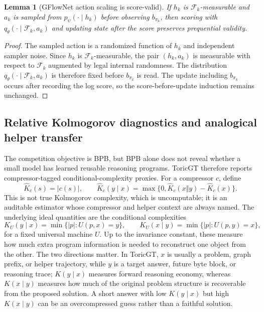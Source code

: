 \documentclass[11pt]{article}
\theoremstyle{definition}
\theoremstyle{plain}
\newtheorem{lemma}[definition]{Lemma}
\theoremstyle{remark}
\numberwithin{equation}{section}
\begin{document}
\begin{lemma}[GFlowNet action scaling is score-valid]
If $h_k$ is $\mathcal F_k$-measurable and $a_k$ is sampled from $p_\psi(\cdot\mid h_k)$ before observing $b_{\pi_k}$, then scoring with $q_\theta(\cdot\mid\mathcal F_k,a_k)$ and updating state after the score preserves prequential validity.
\end{lemma}

\begin{proof}
The sampled action is a randomized function of $h_k$ and independent sampler noise.  Since $h_k$ is $\mathcal F_k$-measurable, the pair $(h_k,a_k)$ is measurable with respect to $\mathcal F_k$ augmented by legal internal randomness.  The distribution $q_\theta(\cdot\mid\mathcal F_k,a_k)$ is therefore fixed before $b_{\pi_k}$ is read.  The update including $b_{\pi_k}$ occurs after recording the log score, so the score-before-update induction remains unchanged.
\end{proof}

\subsection{Relative Kolmogorov diagnostics and analogical helper transfer}

The competition objective is BPB, but BPB alone does not reveal whether a small model has learned reusable reasoning programs.  ToricGT therefore reports compressor-tagged conditional-complexity proxies.  For a compressor $c$, define
\begin{equation}
  \widehat K_c(s)=|c(s)|,\qquad
  \widehat K_c(y\mid x)=\max\{0,\widehat K_c(x\Vert y)-\widehat K_c(x)\}.
\end{equation}
This is not true Kolmogorov complexity, which is uncomputable; it is an auditable estimator whose compressor and helper context are always named.  The underlying ideal quantities are the conditional complexities
\begin{equation}
  K_U(y\mid x)=\min\{|p|:U(p,x)=y\},\qquad
  K_U(x\mid y)=\min\{|p|:U(p,y)=x\},
\end{equation}
for a fixed universal machine $U$.  Up to the invariance constant, these measure how much extra program information is needed to reconstruct one object from the other.  The two directions matter.  In ToricGT, $x$ is usually a problem, graph prefix, or helper trajectory, while $y$ is a target answer, future byte block, or reasoning trace; $K(y\mid x)$ measures forward reasoning economy, whereas $K(x\mid y)$ measures how much of the original problem structure is recoverable from the proposed solution.  A short answer with low $K(y\mid x)$ but high $K(x\mid y)$ can be an overcompressed guess rather than a faithful solution.
\end{document}
